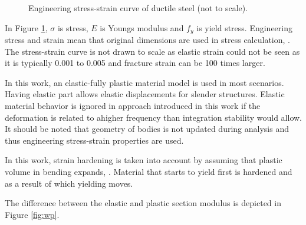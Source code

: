 \begin{figure}
\centering
{}
\caption{Engineering stress-strain curve of ductile steel (not to scale).}
\label{fig:sscurve}
\end{figure}

In Figure \ref{fig:sscurve}, $\sigma$ is stress, $E$ is Youngs modulus and $f_y$ is yield stress.
Engineering stress and strain mean that original dimensions are used in stress calculation,
\cite{dowling}.
The stress-strain curve is not drawn to scale as elastic strain could not be seen as it is typically 
0.001 to 0.005 and fracture strain can be 100 times larger.

In this work, an elastic-fully plastic material model is used in most scenarios.
Having elastic part allows elastic displacements for slender structures. 
Elastic material behavior is ignored in approach introduced in this work if
the deformation is related to ahigher frequency
than integration stability would allow.
It should be noted that geometry
of bodies is not updated during analysis and thus engineering stress-strain properties are used.

In this work, strain hardening is taken into account by assuming that plastic volume in bending
expands, 
\cite{dowling}.
Material that starts to yield first is hardened and as a result of which yielding moves.

The difference between the elastic and plastic section modulus is depicted in Figure \ref{fig:wp}.

